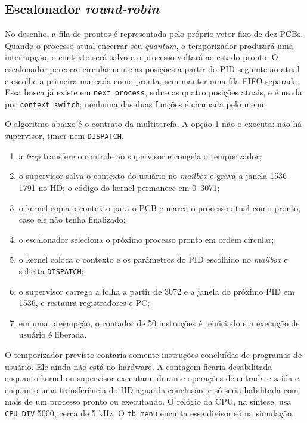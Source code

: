 \documentclass[
    12pt,
    openright,
    a4paper,
    english,
    brazilian
]{abntex2}
\begin{document}
\subsection{Escalonador \emph{round-robin}}

No desenho, a fila de prontos é representada pelo próprio vetor fixo de dez PCBs. Quando o processo atual encerrar seu \emph{quantum}, o temporizador produzirá uma interrupção, o contexto será salvo e o processo voltará ao estado pronto. O escalonador percorre circularmente as posições a partir do PID seguinte ao atual e escolhe a primeira marcada como pronta, sem manter uma fila FIFO separada. Essa busca já existe em \texttt{next\_process}, sobre as quatro posições atuais, e é usada por \texttt{context\_switch}; nenhuma das duas funções é chamada pelo menu.

O algoritmo abaixo é o contrato da multitarefa. A opção 1 não o executa: não há supervisor, timer nem \texttt{DISPATCH}.

\begin{enumerate}
    \item a \emph{trap} transfere o controle ao supervisor e congela o temporizador;
    \item o supervisor salva o contexto do usuário no \emph{mailbox} e grava a janela 1536--1791 no HD; o código do kernel permanece em 0--3071;
    \item o kernel copia o contexto para o PCB e marca o processo atual como pronto, caso ele não tenha finalizado;
    \item o escalonador seleciona o próximo processo pronto em ordem circular;
    \item o kernel coloca o contexto e os parâmetros do PID escolhido no \emph{mailbox} e solicita \texttt{DISPATCH};
    \item o supervisor carrega a folha a partir de 3072 e a janela do próximo PID em 1536, e restaura registradores e PC;
    \item em uma preempção, o contador de 50 instruções é reiniciado e a execução de usuário é liberada.
\end{enumerate}

O temporizador previsto contaria somente instruções concluídas de programas de usuário. Ele ainda não está no hardware. A contagem ficaria desabilitada enquanto kernel ou supervisor executam, durante operações de entrada e saída e enquanto uma transferência do HD aguarda conclusão, e só seria habilitada com mais de um processo pronto ou executando. O relógio da CPU, na síntese, usa \texttt{CPU\_DIV} 5000, cerca de 5 kHz. O \texttt{tb\_menu} encurta esse divisor só na simulação.
\end{document}
